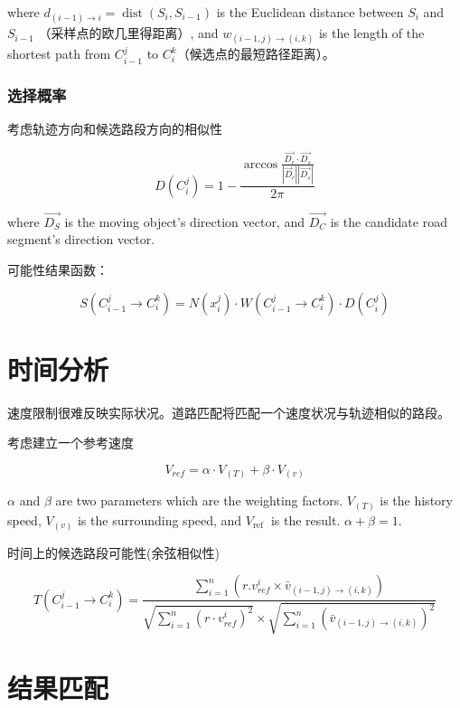where $ d_{(i-1) \rightarrow i}=\operatorname{dist}\left(S_{i}, S_{i-1}\right) $ is the Euclidean distance between $ S_{i} $ and $ S_{i-1} $ （采样点的欧几里得距离）, and $ w_{(i-1, j) \longrightarrow(i, k)} $ is the length of the shortest path from $ C_{i-1}^{j} $ to $ C_{i}^{k} $（候选点的最短路径距离）。

\subsubsection{选择概率}

考虑轨迹方向和候选路段方向的相似性

$$ D\left(C_{i}^{j}\right)=1-\frac{\arccos \frac{\overrightarrow{D_{c}} \cdot \overrightarrow{D_{s}}}{\left|\vec{D}_{c}\right|\left|\overrightarrow{{D}_{s}}\right|}}{2 \pi} $$

where $ \overrightarrow{D_{S}} $ is the moving object's direction vector, and $ \overrightarrow{D_{C}} $ is the candidate road segment's direction vector.

可能性结果函数：

$$ S\left(C_{i-1}^{j} \rightarrow C_{i}^{k}\right)=N\left(x_{i}^{j}\right) \cdot W\left(C_{i-1}^{j} \rightarrow C_{i}^{k}\right) \cdot D\left(C_{i}^{j}\right) $$

\section{时间分析}

速度限制很难反映实际状况。道路匹配将匹配一个速度状况与轨迹相似的路段。

考虑建立一个参考速度

$$ V_{r e f}=\alpha \cdot V_{(T)}+\beta \cdot V_{(v)} $$

$ \alpha $ and $ \beta $ are two parameters which are the weighting factors. $ V_{(T)} $ is the history speed, $ V_{(v)} $ is the surrounding speed, and $ V_{\text {ref }} $ is the result. $\alpha + \beta = 1$.

时间上的候选路段可能性(余弦相似性)

$$ T\left(C_{i-1}^{j} \rightarrow C_{i}^{k}\right)=\frac{\sum_{i=1}^{n}\left(r . v_{r e f}^{i} \times \bar{v}_{(i-1, j) \rightarrow(i, k)}\right)}{\sqrt{\sum_{i=1}^{n}\left(r \cdot v_{r e f}^{i}\right)^{2}} \times \sqrt{\sum_{i=1}^{n}\left(\bar{v}_{(i-1, j) \rightarrow(i, k)}\right)^{2}}} $$

\section{结果匹配}

